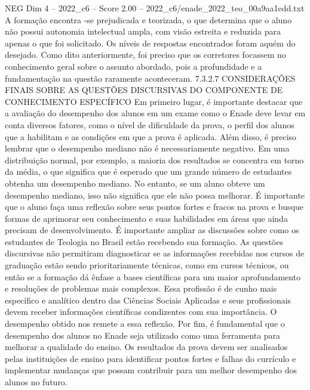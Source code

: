 \begin{textsample}{NEG Dim 4 – 2022\_c6 – Score 2.00 – 2022\_c6/enade\_2022\_teo\_00a9aa1edd.txt}
A formação encontra -se prejudicada e teorizada, o que determina que o aluno não possui autonomia intelectual ampla, com visão estreita e reduzida para apenas o que foi solicitado.
Os níveis de respostas encontrados foram aquém do desejado.
Como dito anteriormente, foi preciso que os corretores focassem no conhecimento geral sobre o assunto abordado, pois a profundidade e a fundamentação na questão raramente aconteceram. 7.3.2.7 CONSIDERAÇÕES FINAIS SOBRE AS QUESTÕES DISCURSIVAS DO COMPONENTE DE CONHECIMENTO ESPECÍFICO Em primeiro lugar, é importante destacar que a avaliação do desempenho dos alunos em um exame como o Enade deve levar em conta diversos fatores, como o nível de dificuldade da prova, o perfil dos alunos que a habilitam e as condições em que a prova é aplicada.
Além disso, é preciso lembrar que o desempenho mediano não é necessariamente negativo.
Em uma distribuição normal, por exemplo, a maioria dos resultados se concentra em torno da média, o que significa que é esperado que um grande número de estudantes obtenha um desempenho mediano.
No entanto, se um aluno obteve um desempenho mediano, isso não significa que ele não possa melhorar.
É importante que o aluno faça uma reflexão sobre seus pontos fortes e fracos na prova e busque formas de aprimorar seu conhecimento e suas habilidades em áreas que ainda precisam de desenvolvimento.
É importante ampliar as discussões sobre como os estudantes de Teologia no Brasil estão recebendo sua formação.
As questões discursivas não permitiram diagnosticar se as informações recebidas nos cursos de graduação estão sendo prioritariamente técnicas, como em cursos técnicos, ou então se a formação dá ênfase a bases científicas para um maior aprofundamento e resoluções de problemas mais complexos.
Essa profissão é de cunho mais específico e analítico dentro das Ciências Sociais Aplicadas e seus profissionais devem receber informações científicas condizentes com sua importância.
O desempenho obtido nos remete a essa reflexão.
Por fim, é fundamental que o desempenho dos alunos no Enade seja utilizado como uma ferramenta para melhorar a qualidade do ensino.
Os resultados da prova devem ser analisados pelas instituições de ensino para identificar pontos fortes e falhas do currículo e implementar mudanças que possam contribuir para um melhor desempenho dos alunos no futuro.

\end{textsample}
